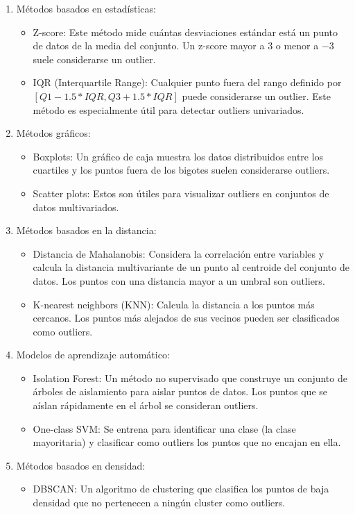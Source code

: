 \documentclass[
  us-letterpaper,
]{scrreprt}
\providecommand{\tightlist}{%
  \setlength{\itemsep}{0pt}\setlength{\parskip}{0pt}}\usepackage{longtable,booktabs,array}
\theoremstyle{plain}
\theoremstyle{plain}
\theoremstyle{definition}
\theoremstyle{remark}
\begin{document}
\begin{enumerate}
\def\labelenumi{\arabic{enumi}.}
\item
  Métodos basados en estadísticas:

  \begin{itemize}
  \item
    Z-score: Este método mide cuántas desviaciones estándar está un
    punto de datos de la media del conjunto. Un z-score mayor a \(3\) o
    menor a \(-3\) suele considerarse un outlier.
  \item
    IQR (Interquartile Range): Cualquier punto fuera del rango definido
    por \([Q1 - 1.5 * IQR, Q3 + 1.5 * IQR]\) puede considerarse un
    outlier. Este método es especialmente útil para detectar outliers
    univariados.
  \end{itemize}
\item
  Métodos gráficos:

  \begin{itemize}
  \item
    Boxplots: Un gráfico de caja muestra los datos distribuidos entre
    los cuartiles y los puntos fuera de los bigotes suelen considerarse
    outliers.
  \item
    Scatter plots: Estos son útiles para visualizar outliers en
    conjuntos de datos multivariados.
  \end{itemize}
\item
  Métodos basados en la distancia:

  \begin{itemize}
  \item
    Distancia de Mahalanobis: Considera la correlación entre variables y
    calcula la distancia multivariante de un punto al centroide del
    conjunto de datos. Los puntos con una distancia mayor a un umbral
    son outliers.
  \item
    K-nearest neighbors (KNN): Calcula la distancia a los puntos más
    cercanos. Los puntos más alejados de sus vecinos pueden ser
    clasificados como outliers.
  \end{itemize}
\item
  Modelos de aprendizaje automático:

  \begin{itemize}
  \item
    Isolation Forest: Un método no supervisado que construye un conjunto
    de árboles de aislamiento para aislar puntos de datos. Los puntos
    que se aíslan rápidamente en el árbol se consideran outliers.
  \item
    One-class SVM: Se entrena para identificar una clase (la clase
    mayoritaria) y clasificar como outliers los puntos que no encajan en
    ella.
  \end{itemize}
\item
  Métodos basados en densidad:

  \begin{itemize}
  \tightlist
  \item
    DBSCAN: Un algoritmo de clustering que clasifica los puntos de baja
    densidad que no pertenecen a ningún cluster como outliers.
  \end{itemize}
\end{enumerate}
\end{document}
